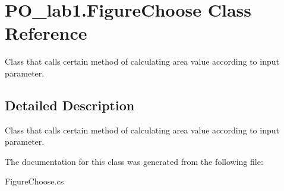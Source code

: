 \hypertarget{class_p_o__lab1_1_1_figure_choose}{}\section{P\+O\+\_\+lab1.\+Figure\+Choose Class Reference}
\label{class_p_o__lab1_1_1_figure_choose}


Class that calls certain method of calculating area value according to input parameter.  




\subsection{Detailed Description}
Class that calls certain method of calculating area value according to input parameter. 



The documentation for this class was generated from the following file\+:\begin{DoxyCompactItemize}
\item 
Figure\+Choose.\+cs\end{DoxyCompactItemize}
